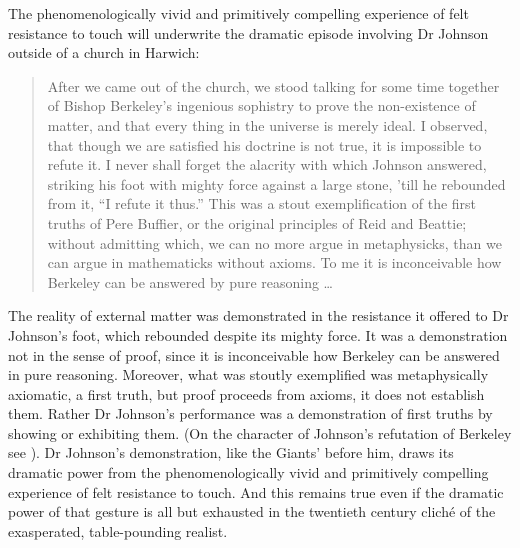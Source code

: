The phenomenologically vivid and primitively compelling experience of felt resistance to touch will underwrite the dramatic episode involving Dr Johnson outside of a church in Harwich:
\begin{quote}
	After we came out of the church, we stood talking for some time together of Bishop Berkeley’s ingenious sophistry to prove the non-existence of matter, and that every thing in the universe is merely ideal. I observed, that though we are satisfied his doctrine is not true, it is impossible to refute it. I never shall forget the alacrity with which Johnson answered, striking his foot with mighty force against a large stone, ’till he rebounded from it, ``I refute it thus.'' This was a stout exemplification of the first truths of Pere Buffier, or the original principles of Reid and Beattie; without admitting which, we can no more argue in metaphysicks, than we can argue in mathematicks without axioms. To me it is inconceivable how Berkeley can be answered by pure reasoning \ldots\ \citep[\textsc{i} 471]{Boswell:1935fk}
\end{quote}
The reality of external matter was demonstrated in the resistance it offered to Dr Johnson’s foot, which rebounded despite its mighty force. It was a demonstration not in the sense of proof, since it is inconceivable how Berkeley can be answered in pure reasoning. Moreover, what was stoutly exemplified was metaphysically axiomatic, a first truth, but proof proceeds from axioms, it does not establish them. Rather Dr Johnson’s performance was a demonstration of first truths by showing or exhibiting them. (On the character of Johnson’s refutation of Berkeley see \citealt{Patey:1986uq}). Dr Johnson's demonstration, like the Giants' before him, draws its dramatic power from the phenomenologically vivid and primitively compelling experience of felt resistance to touch. And this remains true even if the dramatic power of that gesture is all but exhausted in the twentieth century clich\'{e} of the exasperated, table-pounding realist.

